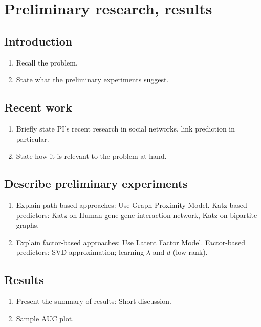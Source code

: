 \documentclass[11pt]{article}
\begin{document}
\section{Preliminary research, results}
\subsection{Introduction}
\begin{enumerate}
\item Recall the problem.
\item State what the preliminary experiments suggest.
\end{enumerate}

\subsection{Recent work}
\begin{enumerate}
\item Briefly state PI's recent research in social networks, link prediction in particular.
\item State how it is relevant to the problem at hand.
\end{enumerate}

\subsection{Describe preliminary experiments}
\begin{enumerate}
\item Explain path-based approaches: Use Graph Proximity Model.
\subitem Katz-based predictors: Katz on Human gene-gene interaction network, Katz on bipartite graphs.
\item Explain factor-based approaches: Use Latent Factor Model.
\subitem Factor-based predictors: SVD approximation; learning $\lambda$ and $d$ (low rank).
\end{enumerate}

\subsection{Results}
\begin{enumerate}
\item Present the summary of results: Short discussion.
\item Sample AUC plot.
\end{enumerate}
\end{document}
